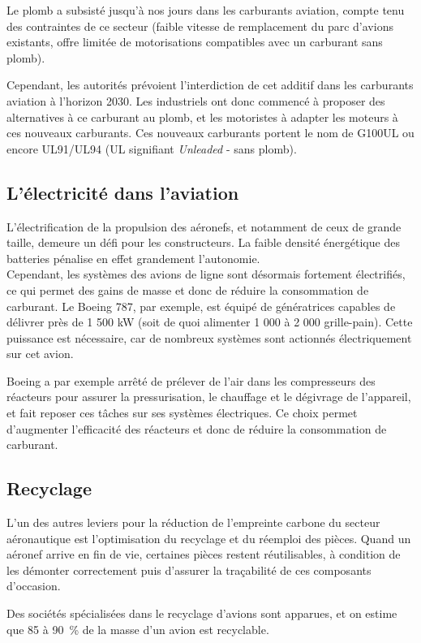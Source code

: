 	Le plomb a subsisté jusqu'à nos jours dans les carburants aviation, compte tenu des contraintes de ce secteur (faible vitesse de remplacement du parc d'avions existants, offre limitée de motorisations compatibles avec un carburant sans plomb).
	
	Cependant, les autorités prévoient l'interdiction de cet additif dans les carburants aviation à l'horizon 2030. Les industriels ont donc commencé à proposer des alternatives à ce carburant au plomb, et les motoristes à adapter les moteurs à ces nouveaux carburants. Ces nouveaux carburants portent le nom de G100UL ou encore UL91/UL94 (UL signifiant \textit{Unleaded} - sans plomb).
	
	\subsection{L'électricité dans l'aviation}
	L'électrification de la propulsion des aéronefs, et notamment de ceux de grande taille, demeure un défi pour les constructeurs. La faible densité énergétique des batteries pénalise en effet grandement l'autonomie. \\
	
	Cependant, les systèmes des avions de ligne sont désormais fortement électrifiés, ce qui permet des gains de masse et donc de réduire la consommation de carburant. Le Boeing 787, par exemple, est équipé de génératrices capables de délivrer près de 1 500 kW (soit de quoi alimenter 1 000 à 2 000 grille-pain). Cette puissance est nécessaire, car de nombreux systèmes sont actionnés électriquement sur cet avion.
	
	Boeing a par exemple arrêté de prélever de l'air dans les compresseurs des réacteurs pour assurer la pressurisation, le chauffage et le dégivrage de l'appareil, et fait reposer ces tâches sur ses systèmes électriques. Ce choix permet d'augmenter l'efficacité des réacteurs et donc de réduire la consommation de carburant.
	
	\subsection{Recyclage}
	L'un des autres leviers pour la réduction de l'empreinte carbone du secteur aéronautique est l'optimisation du recyclage et du réemploi des pièces. Quand un aéronef arrive en fin de vie, certaines pièces restent réutilisables, à condition de les démonter correctement puis d'assurer la traçabilité de ces composants d'occasion.
	
	Des sociétés spécialisées dans le recyclage d'avions sont apparues, et on estime que 85 à 90~\% de la masse d'un avion est recyclable.
	
	
